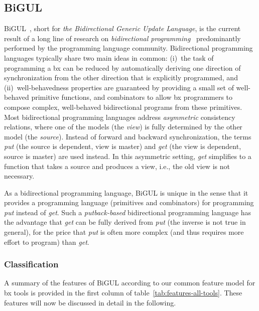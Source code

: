 \subsection{BiGUL}
\label{sec:BiGUL}


BiGUL~\cite{PEPM2016-Ko}, short for \emph{the Bidirectional Generic Update Language}, is the current result of a long line of research on \emph{bidirectional programming}~\cite{Foster2012} predominantly performed by the programming language community.
Bidirectional programming languages typically share two main ideas in common:  (i)~the task of programming a bx can be reduced by automatically deriving one direction of synchronization from the other direction that is explicitly programmed, and (ii)~well-behavedness properties are guaranteed by providing a small set of well-behaved primitive functions, and combinators to allow bx programmers to compose complex, well-behaved bidirectional programs from these primitives.
Most bidirectional programming languages address \emph{asymmetric} consistency relations, where one of the models (the \emph{view}) is fully determined by the other model (the \emph{source}).
Instead of forward and backward synchronization, the terms \emph{put} (the source is dependent, view is master) and \emph{get} (the view is dependent, source is master) are used instead.
In this asymmetric setting, \emph{get} simplifies to a function that takes a source and produces a view, i.e., the old view is not necessary. 

As a bidirectional programming language, BiGUL is unique in the sense that it provides a programming language (primitives and combinators) for programming \emph{put} instead of \emph{get}.
Such a \emph{putback-based} bidirectional programming language has the advantage that \emph{get} can be fully derived from \emph{put} (the inverse is not true in general), for the price that \emph{put} is often more complex (and thus requires more effort to program) than \emph{get}.


\subsubsection{Classification}
A summary of the features of BiGUL according to our common feature model for bx tools is provided in the first column of table~\ref{tab:features-all-tools}.
These features will now be discussed in detail in the following.

